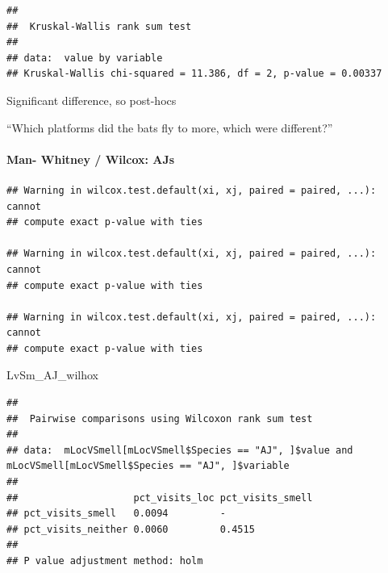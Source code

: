 \documentclass[]{article}
\newenvironment{Shaded}{\begin{snugshade}}{\end{snugshade}}
\newcommand{\KeywordTok}[1]{\textcolor[rgb]{0.13,0.29,0.53}{\textbf{{#1}}}}
\newcommand{\DataTypeTok}[1]{\textcolor[rgb]{0.13,0.29,0.53}{{#1}}}
\newcommand{\StringTok}[1]{\textcolor[rgb]{0.31,0.60,0.02}{{#1}}}
\newcommand{\NormalTok}[1]{{#1}}
\let\oldparagraph\paragraph
\renewcommand{\paragraph}[1]{\oldparagraph{#1}\mbox{}}
\begin{document}
\begin{verbatim}
## 
##  Kruskal-Wallis rank sum test
## 
## data:  value by variable
## Kruskal-Wallis chi-squared = 11.386, df = 2, p-value = 0.00337
\end{verbatim}

Significant difference, so post-hocs

``Which platforms did the bats fly to more, which were different?''

\paragraph{Man- Whitney / Wilcox: AJs}\label{man--whitney-wilcox-ajs-1}

\begin{Shaded}
\end{Shaded}

\begin{verbatim}
## Warning in wilcox.test.default(xi, xj, paired = paired, ...): cannot
## compute exact p-value with ties

## Warning in wilcox.test.default(xi, xj, paired = paired, ...): cannot
## compute exact p-value with ties

## Warning in wilcox.test.default(xi, xj, paired = paired, ...): cannot
## compute exact p-value with ties
\end{verbatim}

\begin{Shaded}
\begin{Highlighting}[]
\NormalTok{LvSm_AJ_wilhox}
\end{Highlighting}
\end{Shaded}

\begin{verbatim}
## 
##  Pairwise comparisons using Wilcoxon rank sum test 
## 
## data:  mLocVSmell[mLocVSmell$Species == "AJ", ]$value and mLocVSmell[mLocVSmell$Species == "AJ", ]$variable 
## 
##                    pct_visits_loc pct_visits_smell
## pct_visits_smell   0.0094         -               
## pct_visits_neither 0.0060         0.4515          
## 
## P value adjustment method: holm
\end{verbatim}
\end{document}

